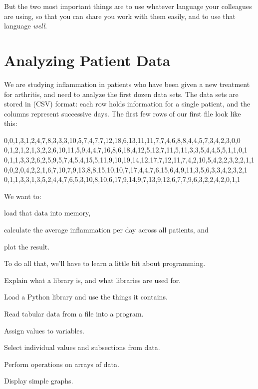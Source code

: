 \documentclass{book}
\begin{document}
But the two most important things are to use whatever language your
colleagues are using, so that you can share you work with them easily,
and to use that language \emph{well}.

\section{Analyzing Patient Data}

We are studying inflammation in patients who have been given a new
treatment for arthritis, and need to analyze the first dozen data sets.
The data sets are stored in 
(CSV) format: each row holds information for a single patient, and the
columns represent successive days. The first few rows of our first file
look like this:

\begin{VerbFile}
0,0,1,3,1,2,4,7,8,3,3,3,10,5,7,4,7,7,12,18,6,13,11,11,7,7,4,6,8,8,4,4,5,7,3,4,2,3,0,0
0,1,2,1,2,1,3,2,2,6,10,11,5,9,4,4,7,16,8,6,18,4,12,5,12,7,11,5,11,3,3,5,4,4,5,5,1,1,0,1
0,1,1,3,3,2,6,2,5,9,5,7,4,5,4,15,5,11,9,10,19,14,12,17,7,12,11,7,4,2,10,5,4,2,2,3,2,2,1,1
0,0,2,0,4,2,2,1,6,7,10,7,9,13,8,8,15,10,10,7,17,4,4,7,6,15,6,4,9,11,3,5,6,3,3,4,2,3,2,1
0,1,1,3,3,1,3,5,2,4,4,7,6,5,3,10,8,10,6,17,9,14,9,7,13,9,12,6,7,7,9,6,3,2,2,4,2,0,1,1
\end{VerbFile}

We want to:

\begin{swcitemize}
\item
  load that data into memory,
\item
  calculate the average inflammation per day across all patients, and
\item
  plot the result.
\end{swcitemize}

To do all that, we'll have to learn a little bit about programming.

\begin{objectives}
\begin{swcitemize}
\item
  Explain what a library is, and what libraries are used for.
\item
  Load a Python library and use the things it contains.
\item
  Read tabular data from a file into a program.
\item
  Assign values to variables.
\item
  Select individual values and subsections from data.
\item
  Perform operations on arrays of data.
\item
  Display simple graphs.
\end{swcitemize}
\end{objectives}
\end{document}
